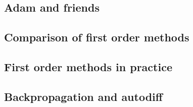 \subsection{Adam and friends}


\subsection{Comparison of first order methods}


\subsection{First order methods in practice}


\subsection{Backpropagation and autodiff}

